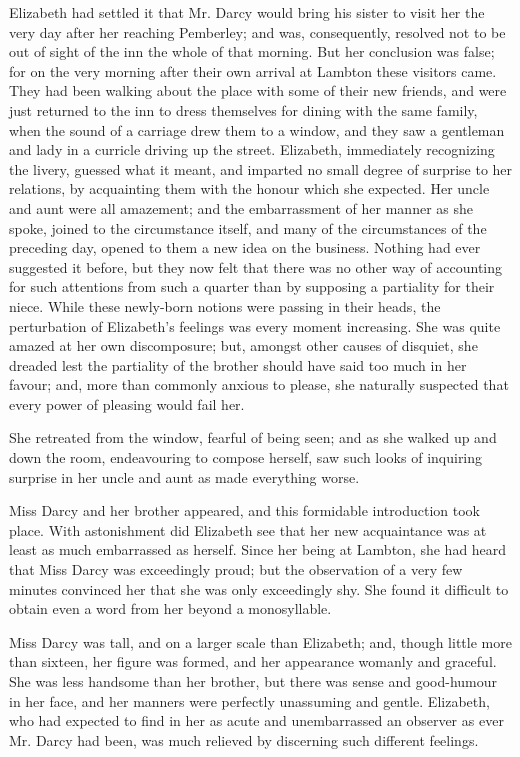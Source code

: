 Elizabeth had settled it that Mr. Darcy would bring his sister to visit her the very day after her reaching Pemberley; and was, consequently, resolved not to be out of sight of the inn the whole of that morning. But her conclusion was false; for on the very morning after their own arrival at Lambton these visitors came. They had been walking about the place with some of their new friends, and were just returned to the inn to dress themselves for dining with the same family, when the sound of a carriage drew them to a window, and they saw a gentleman and lady in a curricle driving up the street. Elizabeth, immediately recognizing the livery, guessed what it meant, and imparted no small degree of surprise to her relations, by acquainting them with the honour which she expected. Her uncle and aunt were all amazement; and the embarrassment of her manner as she spoke, joined to the circumstance itself, and many of the circumstances of the preceding day, opened to them a new idea on the business. Nothing had ever suggested it before, but they now felt that there was no other way of accounting for such attentions from such a quarter than by supposing a partiality for their niece. While these newly-born notions were passing in their heads, the perturbation of Elizabeth's feelings was every moment increasing. She was quite amazed at her own discomposure; but, amongst other causes of disquiet, she dreaded lest the partiality of the brother should have said too much in her favour; and, more than commonly anxious to please, she naturally suspected that every power of pleasing would fail her.

She retreated from the window, fearful of being seen; and as she walked up and down the room, endeavouring to compose herself, saw such looks of inquiring surprise in her uncle and aunt as made everything worse.

Miss Darcy and her brother appeared, and this formidable introduction took place. With astonishment did Elizabeth see that her new acquaintance was at least as much embarrassed as herself. Since her being at Lambton, she had heard that Miss Darcy was exceedingly proud; but the observation of a very few minutes convinced her that she was only exceedingly shy. She found it difficult to obtain even a word from her beyond a monosyllable.

Miss Darcy was tall, and on a larger scale than Elizabeth; and, though little more than sixteen, her figure was formed, and her appearance womanly and graceful. She was less handsome than her brother, but there was sense and good-humour in her face, and her manners were perfectly unassuming and gentle. Elizabeth, who had expected to find in her as acute and unembarrassed an observer as ever Mr. Darcy had been, was much relieved by discerning such different feelings.

